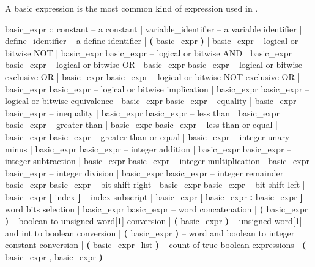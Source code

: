 A basic expression is the most common kind of expression used in
\nusmv.

\begin{Grammar}
basic_expr ::
      constant                      -- a constant
    | variable_identifier           -- a variable identifier
    | define_identifier             -- a define identifier
    | \textbf{(} basic_expr \textbf{)}
    | \operator{!} basic_expr                  -- logical or bitwise NOT
    | basic_expr \operator{\&} basic_expr       -- logical or bitwise AND
    | basic_expr \operator{|} basic_expr       -- logical or bitwise OR
    | basic_expr  basic_expr     -- logical or bitwise exclusive OR
    | basic_expr  basic_expr    -- logical or bitwise NOT exclusive OR
    | basic_expr \operator{->} basic_expr      -- logical or bitwise implication
    | basic_expr \operator{<->} basic_expr     -- logical or bitwise equivalence
    | basic_expr \operator{=} basic_expr       -- equality
    | basic_expr \operator{!=} basic_expr      -- inequality
    | basic_expr \operator{<} basic_expr       -- less than
    | basic_expr \operator{>} basic_expr       -- greater than
    | basic_expr \operator{<=} basic_expr      -- less than or equal
    | basic_expr \operator{>=} basic_expr      -- greater than or equal
    | \operator{-} basic_expr                  -- integer unary minus
    | basic_expr \operator{+} basic_expr       -- integer addition
    | basic_expr \operator{-} basic_expr       -- integer subtraction
    | basic_expr \operator{*} basic_expr       -- integer multiplication
    | basic_expr \operator{/} basic_expr       -- integer division
    | basic_expr  basic_expr     -- integer remainder
    | basic_expr \operator{>>} basic_expr      -- bit shift right
    | basic_expr \operator{<<} basic_expr      -- bit shift left
    | basic_expr \textbf{[} index \textbf{]}          -- index subscript
    | basic_expr \textbf{[} basic_expr \textbf{:} basic_expr \textbf{]}
                                    -- word bits selection
    | basic_expr \operator{::} basic_expr      -- word concatenation
    |  \textbf{(} basic_expr \textbf{)}          -- boolean to unsigned word[1] conversion
    |  \textbf{(} basic_expr \textbf{)}           -- unsigned word[1] and int to boolean conversion
    |  \textbf{(} basic_expr \textbf{)}          -- word and boolean to integer constant conversion
    |  \textbf{(} basic_expr_list \textbf{)}     -- count of true boolean expressions
    |  \textbf{(} basic_expr , basic_expr \textbf{)}        

\end{Grammar}
